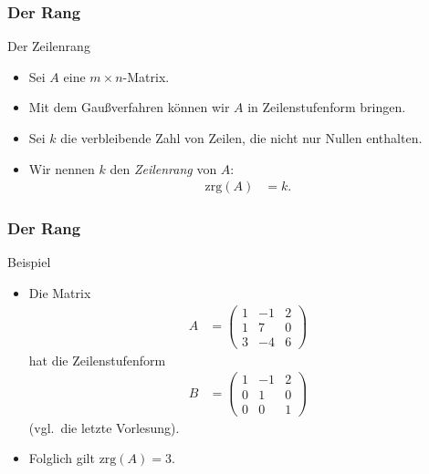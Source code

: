 \documentclass{beamer}
\title[Linadi]{\mytitle}
\author[Amin Coja-Oghlan]{Amin Coja-Oghlan}
\institute[Frankfurt]{JWGUFFM}
\date{}
\renewcommand{\emph}[1]{{\textcolor{solarizedRed}{\itshape #1}}}
\renewcommand{\oe}{\"o}
\newcommand{\rrk}{\mathrm{zrg}}
\newcommand{\mytitle}{Der Rang}
\begin{document}
\frame[plain]{\titlepage}

\begin{frame}\frametitle{\mytitle}
	\begin{block}{Der Zeilenrang}
	\begin{itemize}
		\item Sei $A$ eine $m\times n$-Matrix.
		\item Mit dem Gau\ss verfahren k\oe nnen wir $A$ in Zeilenstufenform bringen.
		\item Sei $k$ die verbleibende Zahl von Zeilen, die nicht nur Nullen enthalten.
		\item Wir nennen $k$ den \emph{Zeilenrang} von $A$:
			\begin{align*}
				\rrk(A)&=k.
			\end{align*}
	\end{itemize}
	\end{block}
\end{frame}

\begin{frame}\frametitle{\mytitle}
	\begin{block}{Beispiel}
		\begin{itemize}
			\item Die Matrix
				\begin{align*}
					A&=\begin{pmatrix}1&-1&2\\1&7&0\\3&-4&6\end{pmatrix}
				\end{align*}
				hat die Zeilenstufenform
				\begin{align*}
					B&=\begin{pmatrix} 1&-1&2\\0&1&0\\0&0&1 \end{pmatrix}
				\end{align*}
				(vgl.\ die letzte Vorlesung).
			\item Folglich gilt $\rrk(A)=3$.
		\end{itemize}
	\end{block}
\end{frame}
\end{document}

